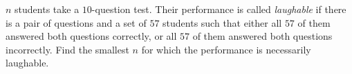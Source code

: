$n$ students take a $10$-question test. Their performance is called \emph{laughable} if there is a pair of questions and a set of $57$ students such that either all $57$ of them answered both questions correctly, or all $57$ of them answered both questions incorrectly. Find the smallest $n$ for which the performance is necessarily laughable.
